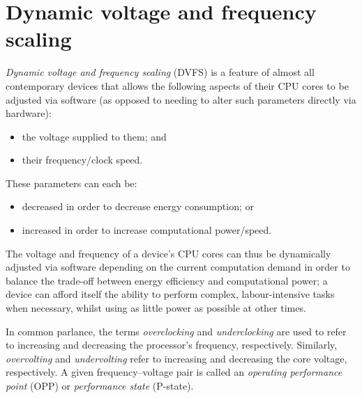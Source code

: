 \section{Dynamic voltage and frequency scaling}

\emph{Dynamic voltage and frequency scaling} (DVFS) is a feature of almost all
contemporary devices that allows the following aspects of their CPU cores to be
adjusted via software (as opposed to needing to alter such parameters directly
via hardware):
\begin{itemize}
    \item the voltage supplied to them; and
    \item their frequency/clock speed.
\end{itemize}

These parameters can each be:
\begin{itemize}
    \item decreased in order to decrease energy consumption; or
    \item increased in order to increase computational power/speed.
\end{itemize}

The voltage and frequency of a device's CPU cores can thus be dynamically
adjusted via software depending on the current computation demand in order to
balance the trade-off between energy efficiency and computational power; a
device can afford itself the ability to perform complex, labour-intensive tasks
when necessary, whilst using as little power as possible at other times.

In common parlance, the terms \emph{overclocking} and \emph{underclocking} are
used to refer to increasing and decreasing the processor's frequency,
respectively. Similarly, \emph{overvolting} and \emph{undervolting} refer to
increasing and decreasing the core voltage, respectively. A given
frequency–voltage pair is called an \emph{operating performance point} (OPP)
or \emph{performance state} (P-state).
